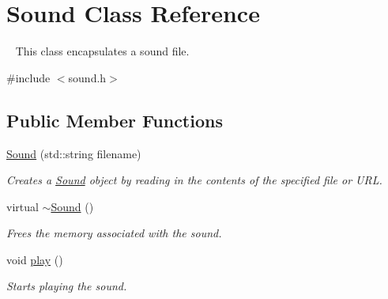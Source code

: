 \hypertarget{classSound}{}\section{Sound Class Reference}
\label{classSound}


~\newline
 This class encapsulates a sound file.  




{\ttfamily \#include $<$sound.\+h$>$}

\subsection*{Public Member Functions}
\begin{DoxyCompactItemize}
\item 
\mbox{\hyperlink{classSound_abc4f1c2a277d6731194905a54294c7ba}{Sound}} (std\+::string filename)
\begin{DoxyCompactList}\small\item\em Creates a {\ttfamily \mbox{\hyperlink{classSound}{Sound}}} object by reading in the contents of the specified file or U\+RL. \end{DoxyCompactList}\item 
virtual \mbox{\hyperlink{classSound_ac34f0a5b7e2e11c053df62714aff04fa}{$\sim$\+Sound}} ()
\begin{DoxyCompactList}\small\item\em Frees the memory associated with the sound. \end{DoxyCompactList}\item 
void \mbox{\hyperlink{classSound_a6d58098c6cf63c241ed03bc797256bb1}{play}} ()
\begin{DoxyCompactList}\small\item\em Starts playing the sound. \end{DoxyCompactList}\end{DoxyCompactItemize}
